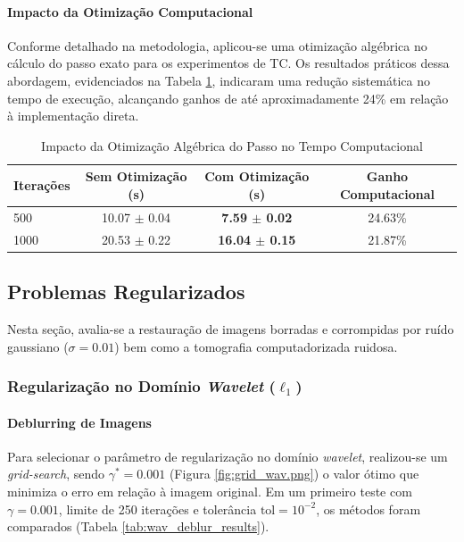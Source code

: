 \documentclass[12pt]{article}
\begin{document}
\paragraph{Impacto da Otimização Computacional}

Conforme detalhado na metodologia, aplicou-se uma otimização algébrica no cálculo do passo exato para os experimentos de TC. Os resultados práticos dessa abordagem, evidenciados na Tabela \ref{tab:tc_sem_reg_otimizacao}, indicaram uma redução sistemática no tempo de execução, alcançando ganhos de até aproximadamente 24\% em relação à implementação direta.

\begin{table}[H]
    \centering
    \caption{Impacto da Otimização Algébrica do Passo no Tempo Computacional}
    \label{tab:tc_sem_reg_otimizacao}
    \begin{tabular}{lccc}
        \toprule
        \textbf{Iterações} & \textbf{Sem Otimização (s)} & \textbf{Com Otimização (s)} & \textbf{Ganho Computacional} \\
        \midrule
        500 & 10.07 $\pm$ 0.04 & \textbf{7.59 $\pm$ 0.02} & 24.63\% \\
        1000 & 20.53 $\pm$ 0.22 & \textbf{16.04 $\pm$ 0.15} & 21.87\% \\
        \bottomrule
    \end{tabular}
\end{table}

\subsection{Problemas Regularizados}

Nesta seção, avalia-se a restauração de imagens borradas e corrompidas por ruído gaussiano ($\sigma=0.01$) bem como a tomografia computadorizada ruidosa.

\subsubsection{Regularização no Domínio \textit{Wavelet} ($\ell_1$)}

\paragraph{Deblurring de Imagens}
Para selecionar o parâmetro de regularização no domínio \textit{wavelet}, realizou-se um \textit{grid-search}, sendo $\gamma^* = 0.001$ (Figura \ref{fig:grid_wav.png}) o valor ótimo que minimiza o erro em relação à imagem original. Em um primeiro teste com $\gamma = 0.001$, limite de 250 iterações e tolerância $\text{tol} = 10^{-2}$, os métodos foram comparados (Tabela \ref{tab:wav_deblur_results}).
\end{document}
